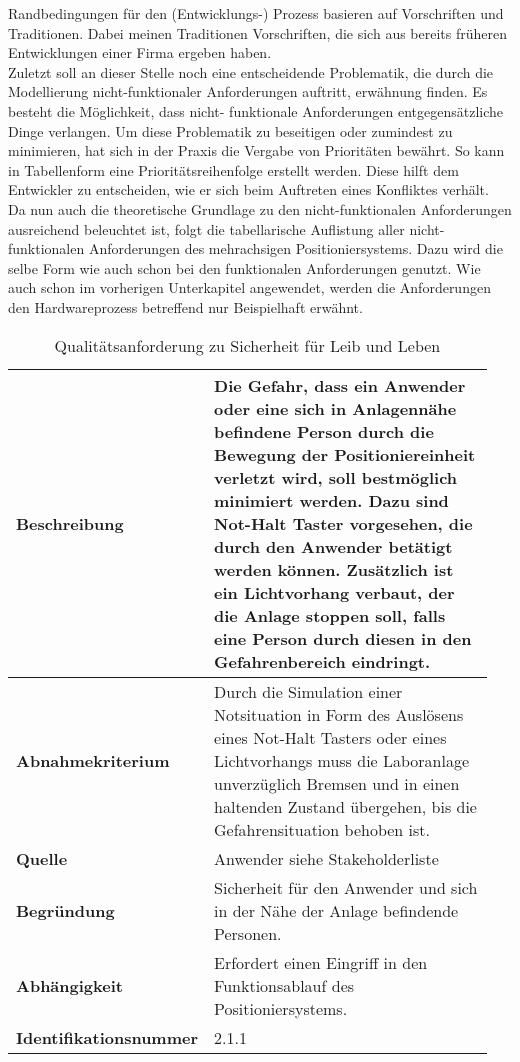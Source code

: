 \documentclass[../Bachelorarbeit.tex]{subfiles}
\begin{document}
Randbedingungen für den (Entwicklungs-) Prozess basieren auf Vorschriften und Traditionen. Dabei meinen Traditionen Vorschriften, die sich aus bereits früheren Entwicklungen einer Firma ergeben haben.\\ %
Zuletzt soll an dieser Stelle noch eine entscheidende Problematik, die durch die Modellierung nicht-funktionaler Anforderungen auftritt, erwähnung finden. Es besteht die Möglichkeit, dass nicht- funktionale Anforderungen entgegensätzliche Dinge verlangen. Um diese Problematik zu beseitigen oder zumindest zu minimieren, hat sich in der Praxis die Vergabe von Prioritäten bewährt. So kann in Tabellenform eine Prioritätsreihenfolge erstellt werden. Diese hilft dem Entwickler zu entscheiden, wie er sich beim Auftreten eines Konfliktes verhält.\\ %
Da nun auch die theoretische Grundlage zu den nicht-funktionalen Anforderungen ausreichend beleuchtet ist, folgt die tabellarische Auflistung aller nicht-funktionalen Anforderungen des mehrachsigen Positioniersystems. Dazu wird die selbe Form wie auch schon bei den funktionalen Anforderungen genutzt. Wie auch schon im vorherigen Unterkapitel angewendet, werden die Anforderungen den Hardwareprozess betreffend nur Beispielhaft erwähnt.

\begin{table}[ht]
    \centering
    \begin{tabular}{| p{0.35\linewidth} | p{0.6\linewidth} |}
        \hline
        \textbf{Beschreibung} & Die Gefahr, dass ein Anwender oder eine sich in Anlagennähe befindene Person durch die Bewegung der Positioniereinheit verletzt wird, soll bestmöglich minimiert werden. Dazu sind Not-Halt Taster vorgesehen, die durch den Anwender betätigt werden können. Zusätzlich ist ein Lichtvorhang verbaut, der die Anlage stoppen soll, falls eine Person durch diesen in den Gefahrenbereich eindringt. \\ \hline
        \textbf{Abnahmekriterium} & Durch die Simulation einer Notsituation in Form des Auslösens eines Not-Halt Tasters oder eines Lichtvorhangs muss die Laboranlage unverzüglich Bremsen und in einen haltenden Zustand übergehen, bis die Gefahrensituation behoben ist. \\ \hline
        \textbf{Quelle} & Anwender siehe Stakeholderliste \\ \hline
        \textbf{Begründung} & Sicherheit für den Anwender und sich in der Nähe der Anlage befindende Personen. \\ \hline
        \textbf{Abhängigkeit} & Erfordert einen Eingriff in den Funktionsablauf des Positioniersystems. \\ \hline
        \textbf{Identifikationsnummer} & 2.1.1 \\ \hline
    \end{tabular}
    \caption[\acs{nfa} - Sicherheit für Leib und Leben]{Qualitätsanforderung zu Sicherheit für Leib und Leben}
    \label{tab:my-table2}
\end{table}

\end{document}
